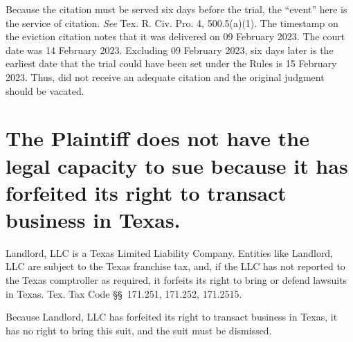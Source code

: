 \documentclass[12pt]{article}
\begin{document}
Because the citation must be served six days before the trial, the ``event'' here is the service of citation. \emph{See} Tex. R. Civ. Pro. 4, 500.5(a)(1). The timestamp on the eviction citation notes that it was delivered on 09 February 2023. The court date was 14 February 2023. Excluding 09 February 2023, six days later is the earliest date that the trial could have been set under the Rules is 15 February 2023. Thus, \client{} did not receive an adequate citation and the original judgment should be vacated.

\section{The Plaintiff does not have the legal capacity to sue because it has forfeited its right to transact business in Texas.}
Landlord, LLC is a Texas Limited Liability Company. Entities like Landlord, LLC are subject to the Texas franchise tax, and, if the LLC has not reported to the Texas comptroller as required, it forfeits its right to bring or defend lawsuits in Texas. Tex. Tax Code \S\S~171.251, 171.252, 171.2515.

\newpage
Because Landlord, LLC has forfeited its right to transact business in Texas, it has no right to bring this suit, and the suit must be dismissed.

\respectfullysubmitted{}
\end{document}
